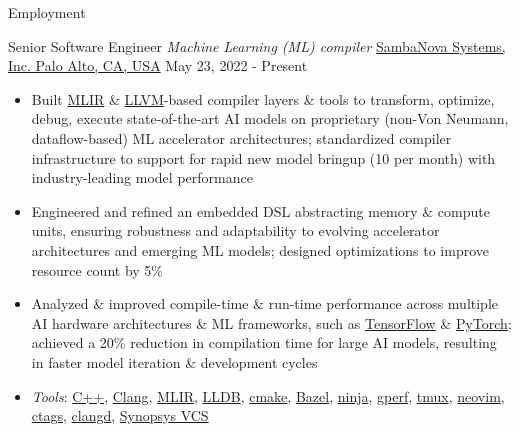 \documentclass[]{mcdowellcv}
\begin{document}
\makeheader

\begin{cvsection}{Employment}
  \begin{cvsubsection}
    {Senior Software Engineer \linebreak \textit{Machine Learning (ML) compiler}}
    {\href{https://sambanova.ai/}{SambaNova Systems, Inc. \linebreak Palo Alto, CA, USA}}
    {May 23, 2022 - Present}
    \begin{itemize}
      \item
            Built \href{https://mlir.llvm.org/}{MLIR} \&
            \href{https://llvm.org/}{LLVM}-based compiler layers \& tools to
            transform, optimize, debug, execute state-of-the-art AI models on
            proprietary (non-Von Neumann, dataflow-based) ML accelerator
            architectures; standardized compiler infrastructure to support for
            rapid new model bringup (10 per month) with industry-leading model
            performance
      \item
            Engineered and refined an embedded DSL abstracting memory \&
            compute units, ensuring robustness and adaptability to evolving
            accelerator architectures and emerging ML models; designed
            optimizations to improve resource count by 5\%
      \item
            Analyzed \& improved compile-time \& run-time performance across
            multiple AI hardware architectures \& ML frameworks, such as
            \href{https://www.tensorflow.org/}{TensorFlow} \&
            \href{https://pytorch.org/}{PyTorch}; achieved a 20\% reduction in
            compilation time for large AI models, resulting in faster model
            iteration \& development cycles
      \item
            \textit{Tools}:
            \href{https://isocpp.org/}{C++},
            \href{https://clang.llvm.org/}{Clang},
            \href{https://mlir.llvm.org/}{MLIR},
            \href{https://lldb.llvm.org/}{LLDB},
            \href{https://cmake.org/}{cmake},
            \href{https://bazel.build/}{Bazel},
            \href{https://ninja-build.org/}{ninja},
            \href{https://gperftools.github.io/gperftools/cpuprofile.html}{gperf},
            \href{https://github.com/tmux/tmux}{tmux},
            \href{https://neovim.io/}{neovim},
            \href{https://github.com/universal-ctags/ctags}{ctags},
            \href{https://clangd.llvm.org/}{clangd},
            \href{https://www.synopsys.com/verification/simulation/vcs.html}{Synopsys VCS}
    \end{itemize}
  \end{cvsubsection}


\end{cvsection}
\end{document}

